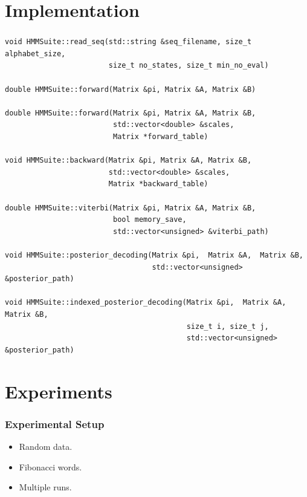 \documentclass[english,notes]{beamer}
\begin{document}
\section{Implementation}

\begin{frame}[fragile]
  \frametitle{\insertsection}
\begin{verbatim}
void HMMSuite::read_seq(std::string &seq_filename, size_t alphabet_size,
                        size_t no_states, size_t min_no_eval)

double HMMSuite::forward(Matrix &pi, Matrix &A, Matrix &B)

double HMMSuite::forward(Matrix &pi, Matrix &A, Matrix &B,
                         std::vector<double> &scales,
                         Matrix *forward_table)

void HMMSuite::backward(Matrix &pi, Matrix &A, Matrix &B,
                        std::vector<double> &scales,
                        Matrix *backward_table)

double HMMSuite::viterbi(Matrix &pi, Matrix &A, Matrix &B,
                         bool memory_save,
                         std::vector<unsigned> &viterbi_path)

void HMMSuite::posterior_decoding(Matrix &pi,  Matrix &A,  Matrix &B,
                                  std::vector<unsigned> &posterior_path)

void HMMSuite::indexed_posterior_decoding(Matrix &pi,  Matrix &A,  Matrix &B,
                                          size_t i, size_t j,
                                          std::vector<unsigned> &posterior_path)
\end{verbatim}
\end{frame}

\section{Experiments}

\begin{frame}
  \frametitle{Experimental Setup}
  \begin{itemize}
  \item Random data.
  \item Fibonacci words.
  \item Multiple runs.
  \end{itemize}
\end{frame}
\end{document}
